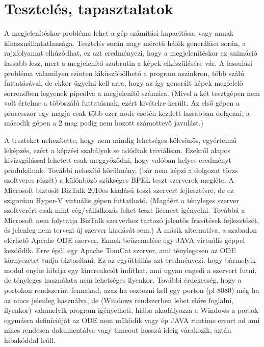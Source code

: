 \section{Tesztelés, tapasztalatok}
A megjelenítéskor probléma lehet a gép számítási kapacitása, vagy annak kihasználhatatlansága. Tesztelés során nagy méretű hálók generálása során, a rajzfolyamat elhúzódhat, ez azt eredményezi, hogy a megjelenítéskor az animáció lassabb lesz, mert a megjelenítő szubrutin a képek elkészülésére vár. A lassulási probléma valamilyen szinten kiküszöbölhető a program aszinkron, több szálú futtatásával, de ekkor ügyelni kell arra, hogy az így generált képek megfelelő sorrendben legyenek pipeolva a megjelenítő számára. (Mivel a két tesztgépen nem volt értelme a többszálú futtatásnak, ezért kivételre került. Az első gépen a processzor egy magja csak több ezer node esetén kezdett lassabban dolgozni, a második gépen a 2 mag pedig nem hozott számottevő javulást.)

A teszteket nehezítette, hogy nem mindig lehetséges kölcsönös, egyértelmű leképzés, ezért a képzési szabályok se adódtak triviálisan. Ezekről alapos kivizsgálással lehetett csak meggyőződni, hogy valóban helyes eredményt produkálnak. További nehezítő körülmény, (bár nem képzi a dolgozat törzs szoftveres részét) a különböző szükséges BPEL teszt szerverek megléte. A Microsoft biztosít BizTalk 2010es kiadású teszt szervert fejlesztésre, de ez szigorúan Hyper-V virtuális gépen futtatható. (Magáért a tényleges szerver szoftverért csak mint cég/vállalkozás lehet teszt licencet igényelni. Továbbá a Microsoft nem folytatja BizTalk szerverhez tartozó jelentős frissítések fejlesztését, és jelenleg nem tervezi új szerver kiadását sem.) A másik alternatíva, a szabadon elérhető Apcahe ODE szerver. Ennek beüzemelése egy JAVA virtuális géppel kezdődik. Erre épül egy Apache TomCat szerver, ami ténylegesen az ODE környezetet tudja biztosítani. Ez az együttállás azt eredményezi, hogy bármelyik modul enyhe hibája egy láncreakciót indíthat, ami ugyan engedi a szervert futni, de tényleges használata nem lehetséges ilyenkor. További érdekesség, hogy a portokon rendszerint fennakad, azaz ha osztozni kell egy porton (pl 8080) még ha az nincs jelenleg használva, de (Windows rendszerben lehet előre foglalni, ilyenkor) valamelyik program igényelheti, hiába akadályozza a Windows a portok egymásra definícióját  az ODE nem működik vagy ép JAVA runtime errort ad ami nincs rendesen dokumentálva vagy timeout hosszú ideig várakozik, aztán hibakóddal leáll. 
